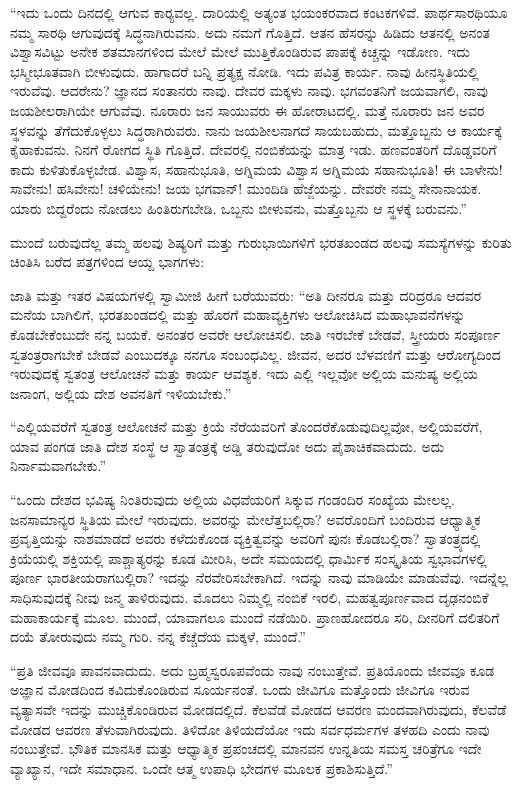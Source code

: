  “ಇದು ಒಂದು ದಿನದಲ್ಲಿ ಆಗುವ ಕಾರ‍್ಯವಲ್ಲ. ದಾರಿಯಲ್ಲಿ ಅತ್ಯಂತ ಭಯಂಕರವಾದ ಕಂಟಕಗಳಿವೆ. ಪಾರ್ಥಸಾರಥಿಯೂ ನಮ್ಮ ಸಾರಥಿ ಆಗುವುದಕ್ಕೆ ಸಿದ್ಧನಾಗಿರುವನು. ಅದು ನಮಗೆ ಗೊತ್ತಿದೆ. ಆತನ ಹೆಸರನ್ನು ಹಿಡಿದು ಆತನಲ್ಲಿ ಅನಂತ ವಿಶ್ವಾಸವಿಟ್ಟು ಅನೇಕ ಶತಮಾನಗಳಿಂದ ಮೇಲೆ ಮೇಲೆ ಮುತ್ತಿಕೊಂಡಿರುವ ಪಾಪಕ್ಕೆ ಕಿಚ್ಚನ್ನು ಇಡೋಣ. ಇದು ಭಸ್ಮೀಭೂತವಾಗಿ ಬೀಳುವುದು. ಹಾಗಾದರೆ ಬನ್ನಿ ಪ್ರತ್ಯಕ್ಷ ನೋಡಿ. ಇದು ಪವಿತ್ರ ಕಾರ್ಯ. ನಾವು ಹೀನಸ್ಥಿತಿಯಲ್ಲಿ ಇರುವೆವು. ಆದರೇನು? ಜ್ಞಾನದ ಸಂತಾನರು ನಾವು. ದೇವರ ಮಕ್ಕಳು ನಾವು. ಭಗವಂತನಿಗೆ ಜಯವಾಗಲಿ, ನಾವು ಜಯಶೀಲರಾಗಿಯೇ ಆಗುವೆವು. ನೂರಾರು ಜನ ಸಾಯುವರು ಈ ಹೋರಾಟದಲ್ಲಿ. ಮತ್ತೆ ನೂರಾರು ಜನ ಅವರ ಸ್ಥಳವನ್ನು ತೆಗೆದುಕೊಳ್ಳಲು ಸಿದ್ಧರಾಗಿರುವರು. ನಾನು ಜಯಶೀಲನಾಗದೆ ಸಾಯಬಹುದು, ಮತ್ತೊಬ್ಬನು ಆ ಕಾರ್ಯಕ್ಕೆ ಕೈಹಾಕುವನು. ನಿನಗೆ ರೋಗದ ಸ್ಥಿತಿ ಗೊತ್ತಿದೆ. ದೇವರಲ್ಲಿ ನಂಬಿಕೆಯನ್ನು ಮಾತ್ರ ಇಡು. ಹಣವಂತರಿಗೆ ದೊಡ್ಡವರಿಗೆ ಕಾದು ಕುಳಿತುಕೊಳ್ಳಬೇಡ. ವಿಶ್ವಾಸ, ಸಹಾನುಭೂತಿ, ಅಗ್ನಿಮಯ ವಿಶ್ವಾಸ ಅಗ್ನಿಮಯ ಸಹಾನುಭೂತಿ! ಈ ಬಾಳೇನು! ಸಾವೇನು! ಹಸಿವೇನು! ಚಳಿಯೇನು! ಜಯ ಭಗವಾನ್! ಮುಂದಿಡಿ ಹೆಜ್ಜೆಯನ್ನು. ದೇವರೇ ನಮ್ಮ ಸೇನಾನಾಯಕ. ಯಾರು ಬಿದ್ದರೆಂದು ನೋಡಲು ಹಿಂತಿರುಗಬೇಡಿ. ಒಬ್ಬನು ಬೀಳುವನು, ಮತ್ತೊಬ್ಬನು ಆ ಸ್ಥಳಕ್ಕೆ ಬರುವನು.” 

 ಮುಂದೆ ಬರುವುದೆಲ್ಲ ತಮ್ಮ ಹಲವು ಶಿಷ್ಯರಿಗೆ ಮತ್ತು ಗುರುಭಾಯಿಗಳಿಗೆ ಭರತಖಂಡದ ಹಲವು ಸಮಸ್ಯೆಗಳನ್ನು ಕುರಿತು ಚಿಂತಿಸಿ ಬರೆದ ಪತ್ರಗಳಿಂದ ಆಯ್ದ ಭಾಗಗಳು: 

 ಜಾತಿ ಮತ್ತು ಇತರ ವಿಷಯಗಳಲ್ಲಿ ಸ್ವಾಮೀಜಿ ಹೀಗೆ ಬರೆಯುವರು: “ಅತಿ ದೀನರೂ ಮತ್ತು ದರಿದ್ರರೂ ಆದವರ ಮನೆಯ ಬಾಗಿಲಿಗೆ, ಭರತಖಂಡದಲ್ಲಿ ಮತ್ತು ಹೊರಗೆ ಮಹಾವ್ಯಕ್ತಿಗಳು ಆಲೋಚಿಸಿದ ಮಹಾಭಾವನೆಗಳನ್ನು ಕೊಡಬೇಕೆಂಬುದೇ ನನ್ನ ಬಯಕೆ. ಅನಂತರ ಅವರೇ ಆಲೋಚಿಸಲಿ. ಜಾತಿ ಇರಬೇಕೆ ಬೇಡವೆ, ಸ್ತ್ರೀಯರು ಸಂಪೂರ್ಣ ಸ್ವತಂತ್ರರಾಗಬೇಕೆ ಬೇಡವೆ ಎಂಬುದಕ್ಕೂ ನನಗೂ ಸಂಬಂಧವಿಲ್ಲ. ಜೀವನ, ಅದರ ಬೆಳವಣಿಗೆ ಮತ್ತು ಆರೋಗ್ಯದಿಂದ ಇರುವುದಕ್ಕೆ ಸ್ವತಂತ್ರ ಆಲೋಚನೆ ಮತ್ತು ಕಾರ್ಯ ಆವಶ್ಯಕ. ಇದು ಎಲ್ಲಿ ಇಲ್ಲವೋ ಅಲ್ಲಿಯ ಮನುಷ್ಯ ಅಲ್ಲಿಯ ಜನಾಂಗ, ಅಲ್ಲಿಯ ದೇಶ ಅವನತಿಗೆ ಇಳಿಯಬೇಕು.” 

 “ಎಲ್ಲಿಯವರೆಗೆ ಸ್ವತಂತ್ರ ಆಲೋಚನೆ ಮತ್ತು ಕ್ರಿಯೆ ನೆರೆಯವರಿಗೆ ತೊಂದರೆ\break ಕೊಡುವುದಿಲ್ಲವೋ‌, ಅಲ್ಲಿಯವರೆಗೆ, ಯಾವ ಪಂಗಡ ಜಾತಿ ದೇಶ ಸಂಸ್ಥೆ ಆ ಸ್ವಾತಂತ್ರಕ್ಕೆ ಅಡ್ಡಿ ತರುವುದೋ ಅದು ಪೈಶಾಚಿಕವಾದುದು. ಅದು ನಿರ್ನಾಮವಾಗಬೇಕು.” 

 “ಒಂದು ದೇಶದ ಭವಿಷ್ಯ ನಿಂತಿರುವುದು ಅಲ್ಲಿಯ ವಿಧವೆಯರಿಗೆ ಸಿಕ್ಕುವ ಗಂಡಂದಿರ ಸಂಖ್ಯೆಯ ಮೇಲಲ್ಲ. ಜನಸಾಮಾನ್ಯರ ಸ್ಥಿತಿಯ ಮೇಲೆ ಇರುವುದು. ಅವರನ್ನು ಮೇಲೆತ್ತಬಲ್ಲಿರಾ? ಅವರೊಂದಿಗೆ ಬಂದಿರುವ ಆಧ್ಯಾತ್ಮಿಕ ಪ್ರವೃತ್ತಿಯನ್ನು ನಾಶಮಾಡದೆ ಅವರು ಕಳೆದುಕೊಂಡ ವ್ಯಕ್ತಿತ್ವವನ್ನು ಅವರಿಗೆ ಪುನಃ ಕೊಡಬಲ್ಲಿರಾ? ಸ್ವಾತಂತ್ರ್ಯದಲ್ಲಿ ಕ್ರಿಯೆಯಲ್ಲಿ ಶಕ್ತಿಯಲ್ಲಿ ಪಾಶ್ಚಾತ್ಯರನ್ನು ಕೂಡ ಮೀರಿಸಿ, ಅದೇ ಸಮಯದಲ್ಲಿ ಧಾರ್ಮಿಕ ಸಂಸ್ಕೃತಿಯ ಸ್ವಭಾವಗಳಲ್ಲಿ ಪೂರ್ಣ ಭಾರತೀಯರಾಗಬಲ್ಲಿರಾ? ಇದನ್ನು ನೆರವೇರಿಸಬೇಕಾಗಿದೆ. ಇದನ್ನು ನಾವು ಮಾಡಿಯೇ ಮಾಡುವೆವು. ಇದನ್ನೆಲ್ಲ ಸಾಧಿಸುವುದಕ್ಕೆ ನೀವು ಜನ್ಮ ತಾಳಿರುವುದು. ಮೊದಲು ನಿಮ್ಮಲ್ಲಿ ನಂಬಿಕೆ ಇರಲಿ, ಮಹತ್ವಪೂರ್ಣವಾದ ದೃಢನಂಬಿಕೆ ಮಹಾಕಾರ್ಯಕ್ಕೆ ಮೂಲ. ಮುಂದೆ, ಯಾವಾಗಲೂ ಮುಂದೆ ನಡೆಯಿರಿ. ಪ್ರಾಣಹೋದರೂ ಸರಿ, ದೀನರಿಗೆ ದಲಿತರಿಗೆ ದಯೆ ತೋರುವುದು ನಮ್ಮ ಗುರಿ. ನನ್ನ ಕೆಚ್ಚೆದೆಯ ಮಕ್ಕಳೆ, ಮುಂದೆ.” 

 “ಪ್ರತಿ ಜೀವವೂ ಪಾವನವಾದುದು. ಅದು ಬ್ರಹ್ಮಸ್ವರೂಪವೆಂದು ನಾವು ನಂಬುತ್ತೇವೆ. ಪ್ರತಿಯೊಂದು ಜೀವವೂ ಕೂಡ ಅಜ್ಞಾನ ಮೋಡದಿಂದ ಕವಿದುಕೊಂಡಿರುವ ಸೂರ್ಯನಂತೆ. ಒಂದು ಜೀವಿಗೂ ಮತ್ತೊಂದು ಜೀವಿಗೂ ಇರುವ ವ್ಯತ್ಯಾಸವೇ ಇದನ್ನು ಮುಚ್ಚಿಕೊಂಡಿರುವ ಮೋಡದಲ್ಲಿದೆ. ಕೆಲವೆಡೆ ಮೋಡದ ಆವರಣ ಮಂದವಾಗಿರುವುದು, ಕೆಲವೆಡೆ ಮೋಡದ ಆವರಣ ತೆಳುವಾಗಿರುವುದು. ತಿಳಿದೋ ತಿಳಿಯದೆಯೋ ಇದು ಸರ್ವಧರ್ಮಗಳ ತಳಹದಿ ಎಂದು ನಾವು ನಂಬುತ್ತೇವೆ. ಭೌತಿಕ ಮಾನಸಿಕ ಮತ್ತು ಆಧ್ಯಾತ್ಮಿಕ ಪ್ರಪಂಚದಲ್ಲಿ ಮಾನವನ ಉನ್ನತಿಯ ಸಮಸ್ತ ಚರಿತ್ರೆಗೂ ಇದೇ ವ್ಯಾಖ್ಯಾನ, ಇದೇ ಸಮಾಧಾನ. ಒಂದೇ ಆತ್ಮ ಉಪಾಧಿ ಭೇದಗಳ ಮೂಲಕ ಪ್ರಕಾಶಿಸುತ್ತಿದೆ.” 


